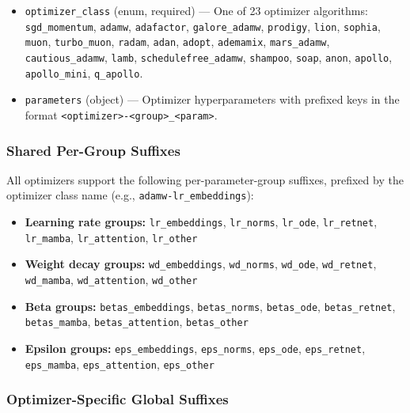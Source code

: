 \begin{itemize}[nosep]
    \item \texttt{optimizer\_class} (enum, required) --- One of 23 optimizer algorithms: \texttt{sgd\_momentum}, \texttt{adamw}, \texttt{adafactor}, \texttt{galore\_adamw}, \texttt{prodigy}, \texttt{lion}, \texttt{sophia}, \texttt{muon}, \texttt{turbo\_muon}, \texttt{radam}, \texttt{adan}, \texttt{adopt}, \texttt{ademamix}, \texttt{mars\_adamw}, \texttt{cautious\_adamw}, \texttt{lamb}, \texttt{schedulefree\_adamw}, \texttt{shampoo}, \texttt{soap}, \texttt{anon}, \texttt{apollo}, \texttt{apollo\_mini}, \texttt{q\_apollo}.
    \item \texttt{parameters} (object) --- Optimizer hyperparameters with prefixed keys in the format \texttt{<optimizer>-<group>\_<param>}.
\end{itemize}

\subsubsection{Shared Per-Group Suffixes}

All optimizers support the following per-parameter-group suffixes, prefixed by the optimizer class name (e.g., \texttt{adamw-lr\_embeddings}):

\begin{itemize}[nosep]
    \item \textbf{Learning rate groups:} \texttt{lr\_embeddings}, \texttt{lr\_norms}, \texttt{lr\_ode}, \texttt{lr\_retnet}, \texttt{lr\_mamba}, \texttt{lr\_attention}, \texttt{lr\_other}
    \item \textbf{Weight decay groups:} \texttt{wd\_embeddings}, \texttt{wd\_norms}, \texttt{wd\_ode}, \texttt{wd\_retnet}, \texttt{wd\_mamba}, \texttt{wd\_attention}, \texttt{wd\_other}
    \item \textbf{Beta groups:} \texttt{betas\_embeddings}, \texttt{betas\_norms}, \texttt{betas\_ode}, \texttt{betas\_retnet}, \texttt{betas\_mamba}, \texttt{betas\_attention}, \texttt{betas\_other}
    \item \textbf{Epsilon groups:} \texttt{eps\_embeddings}, \texttt{eps\_norms}, \texttt{eps\_ode}, \texttt{eps\_retnet}, \texttt{eps\_mamba}, \texttt{eps\_attention}, \texttt{eps\_other}
\end{itemize}

\subsubsection{Optimizer-Specific Global Suffixes}

